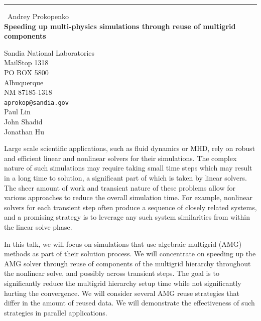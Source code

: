 \documentclass{report}
\begin{document}
\begin{center}
\rule{6in}{1pt} \
{\large Andrey Prokopenko \\
{\bf Speeding up multi-physics simulations through reuse of multigrid components}}

Sandia National Laboratories \\ MailStop 1318 \\ PO BOX 5800 \\ Albuquerque \\ NM 87185-1318
\\
{\tt aprokop@sandia.gov}\\
Paul Lin\\
John Shadid\\
Jonathan Hu\end{center}

Large scale scientific applications, such as fluid dynamics or MHD, rely
on robust and efficient linear and nonlinear solvers for their
simulations. The complex nature of such simulations may require taking
small time steps which may result in a long time to solution, a
significant part of which is taken by linear solvers. The sheer amount of
work and transient nature of these problems allow for various approaches
to reduce the overall simulation time.
For example, nonlinear solvers for each transient step often produce a
sequence of closely related systems, and a promising strategy is to
leverage any such system similarities from within the linear solve phase.

In this talk, we will focus on simulations that use algebraic multigrid
(AMG) methods as part of their solution process. We will concentrate on
speeding up the AMG solver through reuse of
components of the multigrid hierarchy throughout the nonlinear solve, and
possibly across transient steps. The goal is to significantly reduce the
multigrid hierarchy setup time while not
significantly hurting the convergence. We will consider several AMG reuse
strategies that differ in the amount of reused data. We will demonstrate
the effectiveness of such strategies in parallel
applications.
\end{document}
